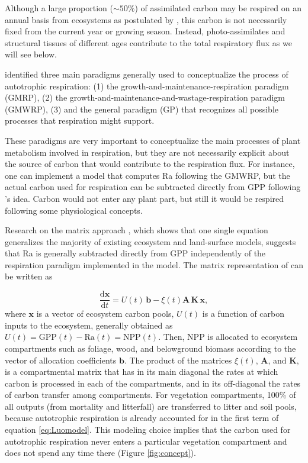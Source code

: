 \documentclass[bg, manuscript]{copernicus}
\begin{document}
Although a large proportion ($\sim 50\%$) of assimilated carbon may be respired on an annual basis from ecosystems as postulated by \citet{Waring1998}, this carbon is not necessarily fixed from the current year or growing season. Instead, photo-assimilates and structural tissues of different ages contribute to the total respiratory flux as we will see below.

\citet{Amthor2000} identified three main paradigms generally used to conceptualize the process of autotrophic respiration: (1) the growth-and-maintenance-respiration paradigm (GMRP), (2) the growth-and-maintenance-and-wastage-respiration paradigm (GMWRP), (3) and the general paradigm (GP) that recognizes all possible processes that respiration might support. 

These paradigms are very important to conceptualize the main processes of plant metabolism involved in respiration, but they are not necessarily explicit about the source of carbon that would contribute to the respiration flux. For instance, one can implement a model that computes Ra following the GMWRP, but the actual carbon used for respiration can be subtracted directly from GPP following \citeauthor{Waring1998}'s \citeyearpar{Waring1998} idea. Carbon would not enter any plant part, but still it would be respired following some physiological concepts. 

Research on the matrix approach \citep{Luo2017}, which shows that one single equation generalizes the majority of existing ecosystem and land-surface models, suggests that Ra is generally subtracted directly from GPP independently of the respiration paradigm implemented in the model.
The matrix representation of \citet{Luo2017} can be written as

\begin{equation} \label{eq:Luomodel}
\frac{\mathrm{d} \bm{x}}{\mathrm{d}t} =  U(t) \, \bm{b} - \xi(t) \mathbf{A} \, \mathbf{K} \, \bm{x},
\end{equation}
where $\bm{x}$ is a vector of ecosystem carbon pools, $U(t)$ is a function of carbon inputs to the ecosystem, generally obtained as $U(t) = \mathrm{GPP}(t) - \mathrm{Ra}(t) = \mathrm{NPP}(t)$. Then, NPP is allocated to ecosystem compartments such as foliage, wood, and belowground biomass according to the vector of allocation coefficients $\bm{b}$. The product of the matrices $\xi(t)$,  $\mathbf{A}$, and $\mathbf{K}$, is a compartmental matrix that has in its main diagonal the rates at which carbon is processed in each of the compartments, and in its off-diagonal the rates of carbon transfer among compartments. For vegetation compartments, 100\% of all outputs (from mortality and litterfall) are transferred to litter and soil pools, because autotrophic  respiration is already accounted for in the first term of  equation \eqref{eq:Luomodel}. This modeling choice implies that the carbon used for autotrophic respiration never enters a particular vegetation compartment and does not spend any time there (Figure \ref{fig:concept}).
\end{document}
